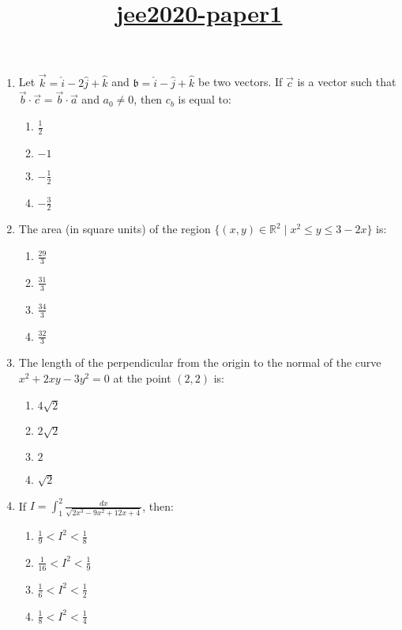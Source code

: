 \documentclass{article}
\title{\underline{\textbf{jee2020-paper1
}}}
\date{}
\begin{document}
\maketitle
\begin{enumerate}

\item Let $\vec{k} = \hat{i} - 2\hat{j} + \hat{k}$ and $\mathfrak{b} = \hat{i} - \hat{j} + \hat{k}$ be two vectors. If $\vec{c}$ is a vector such that $\vec{b} \cdot \vec{c} = \vec{b} \cdot \vec{a}$ and $a_0 \neq 0$, then $c_b$ is equal to:

	\begin{enumerate}
    \item $\frac{1}{2}$
    \item $ - 1$
    \item $-\frac{1}{2}$
    \item $ - \frac{3}{2}$
\end{enumerate}

\item The area (in square units) of the region $\{(x, y) \in \mathbb{R}^2 \mid x^2 \leq y \leq 3 - 2x\}$ is:

\begin{enumerate}
    \item $\frac{29}{3}$
    \item $ \frac{31}{3}$
    \item $\frac{34}{3}$
    \item $\frac{32}{3}$
\end{enumerate}

\item The length of the perpendicular from the origin to the normal of the curve $x^2 + 2xy - 3y^2 = 0$ at the point $(2,2)$ is:

\begin{enumerate}
    \item $4\sqrt{2}$
    \item $2\sqrt{2}$
    \item $2$
    \item $\sqrt{2}$
\end{enumerate}

\item If $I = \int_{1}^{2} \frac{dx}{\sqrt{2x^3 - 9x^2 + 12x + 4}}$, then:

\begin{enumerate}
    \item $\frac{1}{9} < I^2 < \frac{1}{8}$
    \item $\frac{1}{16} < I^2 < \frac{1}{9}$
    \item $\frac{1}{6} < I^2 < \frac{1}{2}$
    \item $\frac{1}{8} < I^2 < \frac{1}{4}$
\end{enumerate}


\end{enumerate}
\end{document}

